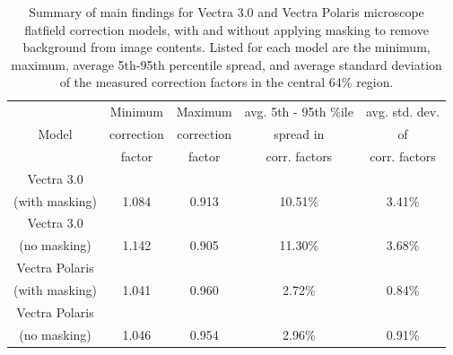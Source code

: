 \documentclass[letterpaper,11pt]{article}
\begin{document}
\begin{table}[!htb]
\centering
\small
\begin{tabular}{c c c c c}
\hline \hline
               & Minimum    & Maximum    & avg. 5th - 95th \%ile & avg. std. dev. \\
Model          & correction & correction & spread in             & of             \\
               & factor     & factor     & corr. factors         & corr. factors  \\
\hline \hline
Vectra 3.0     &            &            &                       &                \\
(with masking) & 1.084      & 0.913      & 10.51\%               & 3.41\%         \\[0.1cm]
\hline
Vectra 3.0     &            &            &                       &                \\
(no masking)   & 1.142      & 0.905      & 11.30\%               & 3.68\%         \\[0.1cm]
\hline
Vectra Polaris &            &            &                       &                \\
(with masking) & 1.041      & 0.960      & 2.72\%                & 0.84\%         \\[0.1cm]
\hline
Vectra Polaris &            &            &                       &                \\
(no masking)   & 1.046      & 0.954      & 2.96\%                & 0.91\%         \\[0.1cm]
\hline \hline
\end{tabular}
\caption{\footnotesize Summary of main findings for Vectra 3.0 and Vectra Polaris microscope flatfield correction models, with and without applying masking to remove background from image contents. Listed for each model are the minimum, maximum, average 5th-95th percentile spread, and average standard deviation of the measured correction factors in the central 64\% region.}
\label{tab:summary_flatfield}
\end{table}
\end{document}
